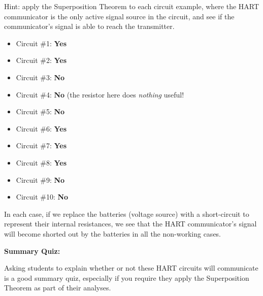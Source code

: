 Hint: apply the Superposition Theorem to each circuit example, where the HART communicator is the only active signal source in the circuit, and see if the communicator's signal is able to reach the transmitter.







\begin{itemize}
\item{} Circuit \#1: {\bf Yes}
\item{} Circuit \#2: {\bf Yes}
\item{} Circuit \#3: {\bf No}
\item{} Circuit \#4: {\bf No} (the resistor here does {\it nothing} useful!
\item{} Circuit \#5: {\bf No}
\item{} Circuit \#6: {\bf Yes}
\item{} Circuit \#7: {\bf Yes}
\item{} Circuit \#8: {\bf Yes}
\item{} Circuit \#9: {\bf No}
\item{} Circuit \#10: {\bf No}
\end{itemize}

In each case, if we replace the batteries (voltage source) with a short-circuit to represent their internal resistances, we see that the HART communicator's signal will become shorted out by the batteries in all the non-working cases.





\vfil \eject

\noindent
{\bf Summary Quiz:}

Asking students to explain whether or not these HART circuits will communicate is a good summary quiz, especially if you require they apply the Superposition Theorem as part of their analyses.



